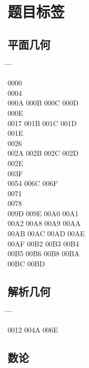 \documentclass[twoside, twocolumn]{ctexart}
\newenvironment{problist}{
  \begin{center} \ttfamily \begin{tabbing}
      \hspace{50pt} \= \hspace{50pt} \= \hspace{50pt} \= \kill
  }{ \end{tabbing} \end{center} }
\begin{document}
  \balance

  \section*{题目标签}

  \subsection*{平面几何}

  \begin{problist}
    0000    \\ 0004    \\
    000A \> 000B \> 000C \> 000D \\ 000E    \\
    0017 \> 001B \> 001C \> 001D \\ 001E    \\
    0026    \\ 002A \> 002B \> 002C \> 002D \\
    002E    \\ 003F    \\
    0054  \> 006C \> 006F \\ 0071    \\
    0078    \\ 009D \> 009E \> 00A0 \> 00A1 \\
    00A2 \> 00A8 \> 00A9 \> 00AA \\ 00AB \> 00AC \> 00AD \> 00AE \\
    00AF \> 00B2 \> 00B3 \> 00B4 \\ 00B5 \> 00B6 \> 00B8 \> 00BA \\
    00BC \> 00BD \\
  \end{problist}

  \subsection*{解析几何}

  \begin{problist}
    0012  \> 004A \> 006E \\
  \end{problist}

  \subsection*{数论}
\end{document}

